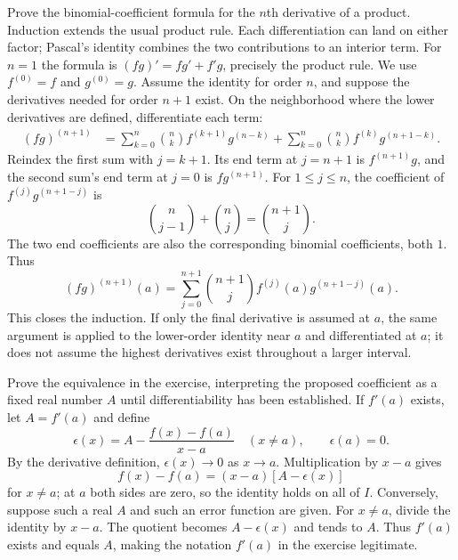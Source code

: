 \goal Prove the binomial-coefficient formula for the $n$th derivative of a product.
\idea Induction extends the usual product rule. Each differentiation can land on either factor; Pascal's identity combines the two contributions to an interior term.
For $n=1$ the formula is $(fg)'=fg'+f'g$, precisely the product rule. We use $f^{(0)}=f$ and $g^{(0)}=g$.
Assume the identity for order $n$, and suppose the derivatives needed for order $n+1$ exist. On the neighborhood where the lower derivatives are defined, differentiate each term:
\begin{align*}
 (fg)^{(n+1)}
 &=\sum_{k=0}^n\binom nk f^{(k+1)}g^{(n-k)}
   +\sum_{k=0}^n\binom nk f^{(k)}g^{(n+1-k)}.
\end{align*}
Reindex the first sum with $j=k+1$. Its end term at $j=n+1$ is $f^{(n+1)}g$, and the second sum's end term at $j=0$ is $fg^{(n+1)}$. For $1\le j\le n$, the coefficient of $f^{(j)}g^{(n+1-j)}$ is
\[
 \binom n{j-1}+\binom nj=\binom{n+1}j.
\]
The two end coefficients are also the corresponding binomial coefficients, both $1$. Thus
\[
 (fg)^{(n+1)}(a)=\sum_{j=0}^{n+1}\binom{n+1}j
 f^{(j)}(a)g^{(n+1-j)}(a).
\]
This closes the induction. If only the final derivative is assumed at $a$, the same argument is applied to the lower-order identity near $a$ and differentiated at $a$; it does not assume the highest derivatives exist throughout a larger interval.

\goal Prove the equivalence in the exercise, interpreting the proposed coefficient as a fixed real number $A$ until differentiability has been established.
If $f'(a)$ exists, let $A=f'(a)$ and define
\[
 \epsilon(x)=A-\frac{f(x)-f(a)}{x-a}\quad(x\ne a),\qquad \epsilon(a)=0.
\]
By the derivative definition, $\epsilon(x)\to0$ as $x\to a$. Multiplication by $x-a$ gives
\[
 f(x)-f(a)=(x-a)[A-\epsilon(x)]
\]
for $x\ne a$; at $a$ both sides are zero, so the identity holds on all of $I$.
Conversely, suppose such a real $A$ and such an error function are given. For $x\ne a$, divide the identity by $x-a$. The quotient becomes $A-\epsilon(x)$ and tends to $A$. Thus $f'(a)$ exists and equals $A$, making the notation $f'(a)$ in the exercise legitimate.
